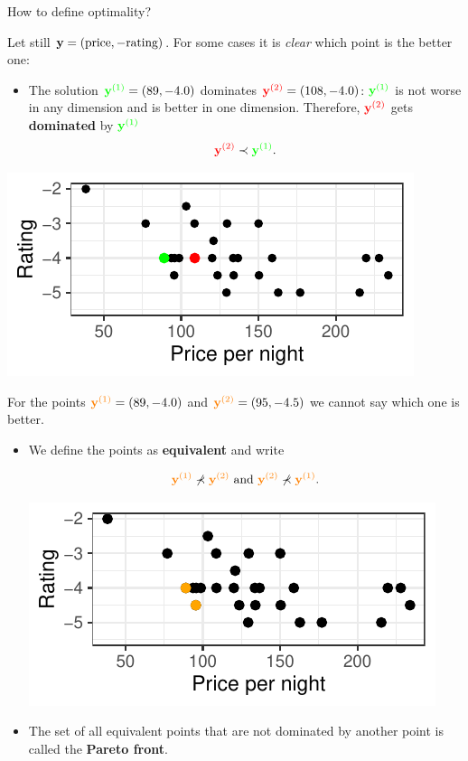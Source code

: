 \begin{frame}[allowframebreaks]{How to define optimality?}

Let still $\mathbf{y} = (\text{price}, - \text{rating})$. For some cases it is \textit{clear} which point is the better one:

\begin{itemize}
    \item The solution $\textcolor{green}{\mathbf{y}^{(1)}} = \left(89, - 4.0\right)$ dominates $\textcolor{red}{\mathbf{y}^{(2)}} = \left(108, - 4.0\right)$: $\textcolor{green}{\mathbf{y}^{(1)}}$ is not worse in any dimension and is better in one dimension. Therefore, $\textcolor{red}{\mathbf{y}^{(2)}}$ gets \textbf{dominated} by $\textcolor{green}{\mathbf{y}^{(1)}}$
$$
\textcolor{red}{\mathbf{y}^{(2)}} \prec \textcolor{green}{\mathbf{y}^{(1)}}.
$$
\end{itemize}

\centering \includegraphics[width=0.5\linewidth]{images/expedia-3-1}

\framebreak

For the points $\textcolor{orange}{\mathbf{y}^{(1)}} = \left(89, - 4.0\right)$ and $\textcolor{orange}{\mathbf{y}^{(2)}} = \left(95, - 4.5\right)$ we cannot say which one is better.

\begin{itemize}
\item We define the points as \textbf{equivalent} and write

$$
\textcolor{orange}{\mathbf{y}^{(1)}} \not\prec \textcolor{orange}{\mathbf{y}^{(2)}} \text{ and } \textcolor{orange}{\mathbf{y}^{(2)}} \not\prec \textcolor{orange}{\mathbf{y}^{(1)}}.
$$

\centering \includegraphics[width=0.5\linewidth]{images/expedia-4-1}


\item The set of all equivalent points that are not dominated by another point is called the \textbf{Pareto front}.


\end{itemize}
\end{frame}
